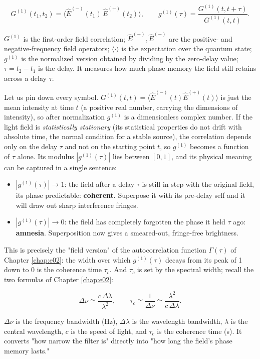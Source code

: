 \begin{equation}
  G^{(1)}(t_1,t_2)=\big\langle \hat E^{(-)}(t_1)\,\hat E^{(+)}(t_2)\big\rangle,
  \qquad
  g^{(1)}(\tau)=\frac{G^{(1)}(t,t+\tau)}{G^{(1)}(t,t)} .
  \label{eq:e08-g1}
\end{equation}
\begin{formulaexplain}
\(G^{(1)}\) is the first-order field correlation; \(\hat E^{(+)},\hat E^{(-)}\) are the positive- and negative-frequency field operators; \(\langle\cdot\rangle\) is the expectation over the quantum state; \(g^{(1)}\) is the normalized version obtained by dividing by the zero-delay value; \(\tau=t_2-t_1\) is the delay. It measures how much phase memory the field still retains across a delay \(\tau\).
\end{formulaexplain}

Let us pin down every symbol. \(G^{(1)}(t,t)=\langle\hat E^{(-)}(t)\hat E^{(+)}(t)\rangle\) is just the mean intensity at time \(t\) (a positive real number, carrying the dimensions of intensity), so after normalization \(g^{(1)}\) is a dimensionless complex number. If the light field is \emph{statistically stationary} (its statistical properties do not drift with absolute time, the normal condition for a stable source), the correlation depends only on the delay \(\tau\) and not on the starting point \(t\), so \(g^{(1)}\) becomes a function of \(\tau\) alone. Its modulus \(|g^{(1)}(\tau)|\) lies between \([0,1]\), and its physical meaning can be captured in a single sentence:

\begin{itemize}
  \item \(|g^{(1)}(\tau)|\to1\): the field after a delay \(\tau\) is still in step with the original field, its phase predictable: \textbf{coherent}. Superpose it with its pre-delay self and it will draw out sharp interference fringes.
  \item \(|g^{(1)}(\tau)|\to0\): the field has completely forgotten the phase it held \(\tau\) ago: \textbf{amnesia}. Superposition now gives a smeared-out, fringe-free brightness.
\end{itemize}

This is precisely the "field version" of the autocorrelation function \(\Gamma(\tau)\) of Chapter \ref{chap:e02}: the width over which \(g^{(1)}(\tau)\) decays from its peak of 1 down to 0 is the coherence time \(\tau_c\). And \(\tau_c\) is set by the spectral width; recall the two formulas of Chapter \ref{chap:e02}:

\begin{equation}
  \Delta\nu\simeq\frac{c\,\Delta\lambda}{\lambda^2},
  \qquad
  \tau_c\simeq\frac{1}{\Delta\nu}\simeq\frac{\lambda^2}{c\,\Delta\lambda}.
  \label{eq:e08-tauc}
\end{equation}
\begin{formulaexplain}
\(\Delta\nu\) is the frequency bandwidth (Hz), \(\Delta\lambda\) is the wavelength bandwidth, \(\lambda\) is the central wavelength, \(c\) is the speed of light, and \(\tau_c\) is the coherence time (s). It converts "how narrow the filter is" directly into "how long the field's phase memory lasts."
\end{formulaexplain}

